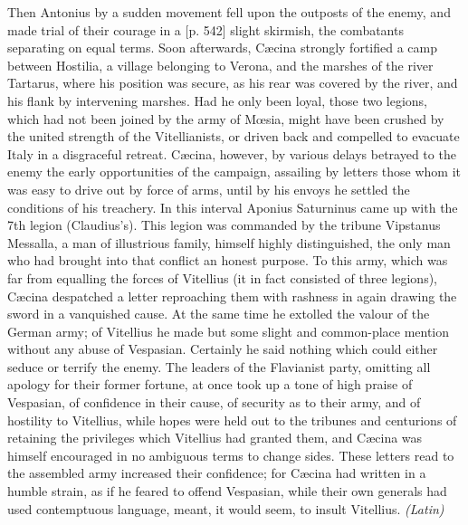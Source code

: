 Then Antonius by a sudden movement fell upon the outposts of the enemy, and made trial of their courage in a [p. 542] slight skirmish, the combatants separating on equal terms. Soon afterwards, Cæcina strongly fortified a camp between Hostilia, a village belonging to Verona, and the marshes of the river Tartarus, where his position was secure, as his rear was covered by the river, and his flank by intervening marshes. Had he only been loyal, those two legions, which had not been joined by the army of Mœsia, might have been crushed by the united strength of the Vitellianists, or driven back and compelled to evacuate Italy in a disgraceful retreat. Cæcina, however, by various delays betrayed to the enemy the early opportunities of the campaign, assailing by letters those whom it was easy to drive out by force of arms, until by his envoys he settled the conditions of his treachery. In this interval Aponius Saturninus came up with the 7th legion (Claudius's). This legion was commanded by the tribune Vipstanus Messalla, a man of illustrious family, himself highly distinguished, the only man who had brought into that conflict an honest purpose. To this army, which was far from equalling the forces of Vitellius (it in fact consisted of three legions), Cæcina despatched a letter reproaching them with rashness in again drawing the sword in a vanquished cause. At the same time he extolled the valour of the German army; of Vitellius he made but some slight and common-place mention without any abuse of Vespasian. Certainly he said nothing which could either seduce or terrify the enemy. The leaders of the Flavianist party, omitting all apology for their former fortune, at once took up a tone of high praise of Vespasian, of confidence in their cause, of security as to their army, and of hostility to Vitellius, while hopes were held out to the tribunes and centurions of retaining the privileges which Vitellius had granted them, and Cæcina was himself encouraged in no ambiguous terms to change sides. These letters read to the assembled army increased their confidence; for Cæcina had written in a humble strain, as if he feared to offend Vespasian, while their own generals had used contemptuous language, meant, it would seem, to insult Vitellius. \emph{(Latin)}


